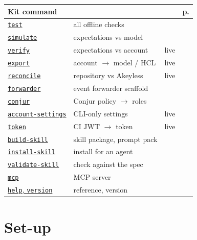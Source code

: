 \documentclass[10pt,a4paper,openany]{report}
\begin{document}
\begin{minipage}[t]{0.49\linewidth}\small
\begin{tabularx}{\linewidth}{@{}lXlr@{}}
\toprule
\textbf{Kit command} & & & \textbf{p.} \\ \midrule
\hyperref[kit:test]{\texttt{test}} & all offline checks & & \pageref{kit:test} \\
\hyperref[kit:simulate]{\texttt{simulate}} & expectations vs model & & \pageref{kit:simulate} \\
\hyperref[kit:verify]{\texttt{verify}} & expectations vs account & live & \pageref{kit:verify} \\
\hyperref[kit:export]{\texttt{export}} & account $\rightarrow$ model / HCL & live & \pageref{kit:export} \\
\hyperref[kit:reconcile]{\texttt{reconcile}} & repository vs Akeyless & live & \pageref{kit:reconcile} \\
\hyperref[kit:forwarder]{\texttt{forwarder}} & event forwarder scaffold & & \pageref{kit:forwarder} \\
\hyperref[kit:conjur]{\texttt{conjur}} & Conjur policy $\rightarrow$ roles & & \pageref{kit:conjur} \\
\hyperref[kit:account-settings]{\texttt{account-settings}} & CLI-only settings & live & \pageref{kit:account-settings} \\
\hyperref[kit:token]{\texttt{token}} & CI JWT $\rightarrow$ token & live & \pageref{kit:token} \\
\hyperref[kit:build-skill]{\texttt{build-skill}} & skill package, prompt pack & & \pageref{kit:build-skill} \\
\hyperref[kit:install-skill]{\texttt{install-skill}} & install for an agent & & \pageref{kit:install-skill} \\
\hyperref[kit:validate-skill]{\texttt{validate-skill}} & check against the spec & & \pageref{kit:validate-skill} \\
\hyperref[kit:mcp]{\texttt{mcp}} & MCP server & & \pageref{kit:mcp} \\
\hyperref[kit:help]{\texttt{help}, \texttt{version}} & reference, version & & \pageref{kit:help} \\
\bottomrule
\end{tabularx}
\end{minipage}

\chapter{Set-up}\label{ch:setup}
\end{document}
